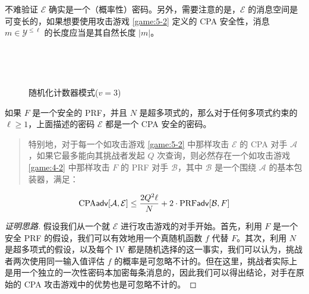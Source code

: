 不难验证 $\mathcal{E}$ 确实是一个（概率性）密码。另外，需要注意的是，$\mathcal{E}$ 的消息空间是可变长的，如果想要使用攻击游戏 \ref{game:5-2} 定义的 CPA 安全性，消息 $m\in\mathcal{Y}^{\leq\ell}$ 的长度应当是其自然长度 $|m|$。

%

\begin{figure}
  \centering
  \subfigure[加密]{}
  
  \,
  
  \,
  
  \subfigure[解密]{}
  \caption{随机化计数器模式($v=3$)}
  \label{fig:5-3}
\end{figure}

\begin{theorem}\label{theo:5-3}
如果 $F$ 是一个安全的 PRF，并且 $N$ 是超多项式的，那么对于任何多项式约束的 $\ell\geq1$，上面描述的密码 $\mathcal{E}$ 都是一个 CPA 安全的密码。
\begin{quote}
特别地，对于每一个如攻击游戏 \ref{game:5-2} 中那样攻击 $\mathcal{E}$ 的 CPA 对手 $\mathcal{A}$，如果它最多能向其挑战者发起 $Q$ 次查询，则必然存在一个如攻击游戏 \ref{game:4-2} 中那样攻击 $F$ 的 PRF 对手 $\mathcal{B}$，其中 $\mathcal{B}$ 是一个围绕 $\mathcal{A}$ 的基本包装器，满足：
\end{quote}
\begin{equation}\label{eq:5-14}
{\rm CPA}\mathsf{adv}[\mathcal{A},\mathcal{E}]\leq\frac{2Q^2\ell}{N}+2\cdot{\rm PRF\mathsf{adv}}[\mathcal{B},F]
\end{equation}
\end{theorem}

\begin{proof}[证明思路]
假设我们从一个就 $\mathcal{E}$ 进行攻击游戏的对手开始。首先，利用 $F$ 是一个安全 PRF 的假设，我们可以有效地用一个真随机函数 $f$ 代替 $F$。其次，利用 $N$ 是超多项式的假设，以及每个 IV 都是随机选择的这一事实，我们可以认为，挑战者两次使用同一输入值评估 $f$ 的概率是可忽略不计的。但在这里，挑战者实际上是用一个独立的一次性密码本加密每条消息的，因此我们可以得出结论，对手在原始的 CPA 攻击游戏中的优势也是可忽略不计的。
\end{proof}

